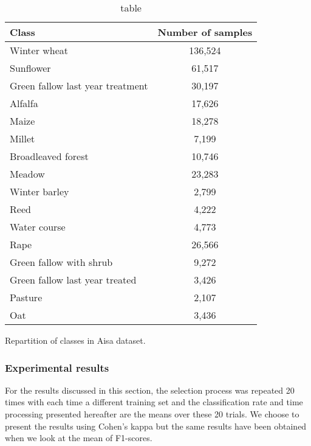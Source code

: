 \documentclass[a4paper,11pt,DIV=16,abstracton]{scrartcl}
\begin{document}
        \begin{table}[!ht]
            \centering
            \begin{tabular}[b]{lc}\hline
              Class & Number of samples \\ \hline
              Winter wheat & 136,524 \\
              Sunflower & 61,517 \\
              Green fallow last year treatment & 30,197 \\
              Alfalfa & 17,626 \\
              Maize & 18,278 \\
              Millet & 7,199 \\
              Broadleaved forest & 10,746 \\
              Meadow & 23,283 \\
              Winter barley & 2,799 \\
              Reed & 4,222 \\
              Water course & 4,773 \\
              Rape & 26,566 \\
              Green fallow with shrub & 9,272 \\
              Green fallow last year treated & 3,426 \\
              Pasture & 2,107 \\
              Oat & 3,436 \\ \hline
            \end{tabular}
            \caption{table}{Repartition of classes in Aisa dataset.\label{tab:aisa}}
        \end{table}

        \subsubsection{Experimental results}

        For the results discussed in this section, the selection process was repeated 20 times with each time a different training set and the classification rate and time processing presented hereafter are the means over these 20 trials. We choose to present the results using Cohen's kappa but the same results have been obtained when we look at the mean of F1-scores.
\end{document}
